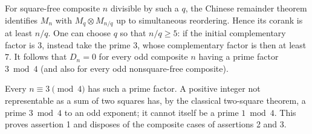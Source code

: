 \documentclass[11pt,a4paper]{article}
\begin{document}
For square-free composite $n$ divisible by such a $q$, the Chinese remainder theorem identifies $M_n$ with $M_q\otimes M_{n/q}$ up to simultaneous reordering. Hence its corank is at least $n/q$. One can choose $q$ so that $n/q\ge5$: if the initial complementary factor is $3$, instead take the prime $3$, whose complementary factor is then at least $7$. It follows that $D_n=0$ for every odd composite $n$ having a prime factor $3\bmod4$ (and also for every odd nonsquare-free composite).

Every $n\equiv3\pmod4$ has such a prime factor. A positive integer not representable as a sum of two squares has, by the classical two-square theorem, a prime $3\bmod4$ to an odd exponent; it cannot itself be a prime $1\bmod4$. This proves assertion 1 and disposes of the composite cases of assertions 2 and 3.
\end{document}
